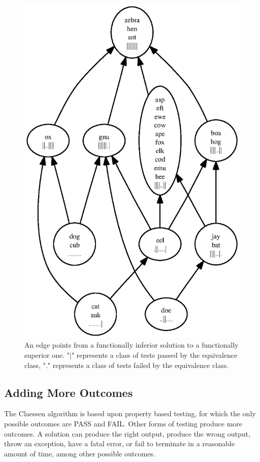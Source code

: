 \documentclass[11pt,twoside]{article}
\theoremstyle{definition}
\begin{document}
\begin{figure}
\centering
\includegraphics{rank1.ps}
\caption{An edge points from a functionally inferior solution to a functionally superior one. "$\vert$" represents a class of tests passed by the equivalence class, "." represents a class of tests failed by the equivalence class.}
\end{figure}


\subsection{Adding More Outcomes}
The Claessen algorithm is based upon property based testing, for which the only possible outcomes are PASS and FAIL. Other forms of testing produce more outcomes. A solution can produce the right output, produce the wrong output, throw an exception, have a fatal error, or fail to terminate in a reasonable amount of time, among other possible outcomes.
\end{document}
